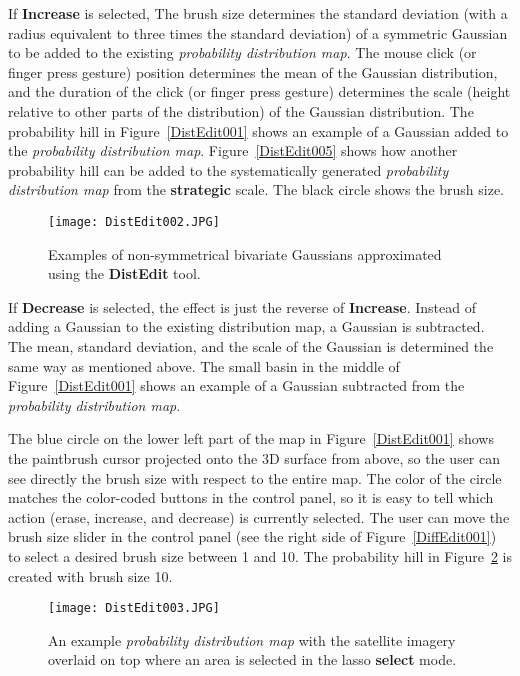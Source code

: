 If \textbf{Increase} is selected, The brush size determines the standard deviation (with a radius equivalent to three times the standard deviation) of a symmetric Gaussian to be added to the existing \textit{probability distribution map}. The mouse click (or finger press gesture) position determines the mean of the Gaussian distribution, and the duration of the click (or finger press gesture) determines the scale (height relative to other parts of the distribution) of the Gaussian distribution. The probability hill in Figure~\ref{DistEdit001} shows an example of a Gaussian added to the \textit{probability distribution map}. Figure~\ref{DistEdit005} shows how another probability hill can be added to the systematically generated \textit{probability distribution map} from the \textbf{strategic} scale. The black circle shows the brush size.

\begin{figure}
\centering
\texttt{[image: DistEdit002.JPG]}
\caption{Examples of non-symmetrical bivariate Gaussians approximated using the \textbf{DistEdit} tool.}
\label{DistEdit002}
\end{figure}

If \textbf{Decrease} is selected, the effect is just the reverse of \textbf{Increase}. Instead of adding a Gaussian to the existing distribution map, a Gaussian is subtracted. The mean, standard deviation, and the scale of the Gaussian is determined the same way as mentioned above. The small basin in the middle of Figure~\ref{DistEdit001} shows an example of a Gaussian subtracted from the \textit{probability distribution map}.

The blue circle on the lower left part of the map in Figure~\ref{DistEdit001} shows the paintbrush cursor projected onto the 3D surface from above, so the user can see directly the brush size with respect to the entire map. The color of the circle matches the color-coded buttons in the control panel, so it is easy to tell which action (erase, increase, and decrease) is currently selected. The user can move the brush size slider in the control panel (see the right side of Figure~\ref{DiffEdit001}) to select a desired brush size between 1 and 10. The probability hill in Figure~\ref{DistEdit003} is created with brush size 10.

\begin{figure}
\centering
\texttt{[image: DistEdit003.JPG]}
\caption{An example \textit{probability distribution map} with the satellite imagery overlaid on top where an area is selected in the lasso \textbf{select} mode.}
\label{DistEdit003}
\end{figure}

